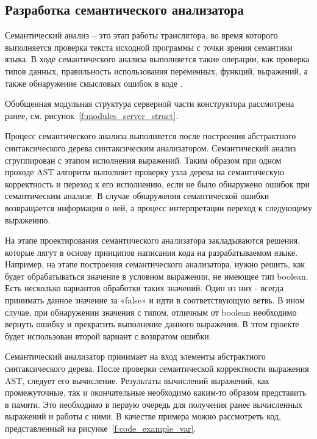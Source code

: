 \subsection{Разработка семантического анализатора}


Семантический анализ – это этап работы транслятора, во время которого выполняется проверка текста исходной программы с точки зрения семантики языка.
В ходе семантического анализа выполняется такие операции, как проверка типов данных, правильность использования переменных, функций, выражений, а также обнаружение смысловых ошибок в коде .

Обобщенная модульная структура серверной части конструктора рассмотрена ранее, см. рисунок~\ref{f:modules_server_struct}.

Процесс семантического анализа выполняется после построения абстрактного синтаксического дерева синтаксическим анализатором.
Семантический анализ сгруппирован с этапом исполнения выражений.
Таким образом при одном проходе AST алгоритм выполняет проверку узла дерева на семантическую корректность и переход к его исполнению,
если не было обнаружено ошибок при семантическим анализе. В случае обнаружения семантической ошибки возвращается информация о ней,
а процесс интерпретации переход к следующему выражению.

На этапе проектирования семантического анализатора закладываются решения, которые лягут в основу принципов написания кода на разрабатываемом языке.
Например, на этапе построения семантического анализатора, нужно решить, как будет обрабатываться значение в условном выражении, не имеющее тип boolean.
Есть несколько вариантов обработки таких значений.
Один из них - всегда принимать данное значение за «false» и идти в соответствующую ветвь.
В ином случае, при обнаружении значения с типом, отличным от boolean необходимо вернуть ошибку и прекратить выполнение данного выражения.
В этом проекте будет использован второй вариант с возвратом ошибки.

Семантический анализатор принимает на вход элементы абстрактного синтаксического дерева.
После проверки семантической корректности выражения AST, следует его вычисление.
Результаты вычислений выражений, как промежуточные, так и окончательные необходимо каким-то образом представить в памяти.
Это необходимо в первую очередь для получения ранее вычисленных выражений и работы с ними.
В качестве примера можно рассмотреть код, представленный на рисунке~\ref{f:code_example_var}.

